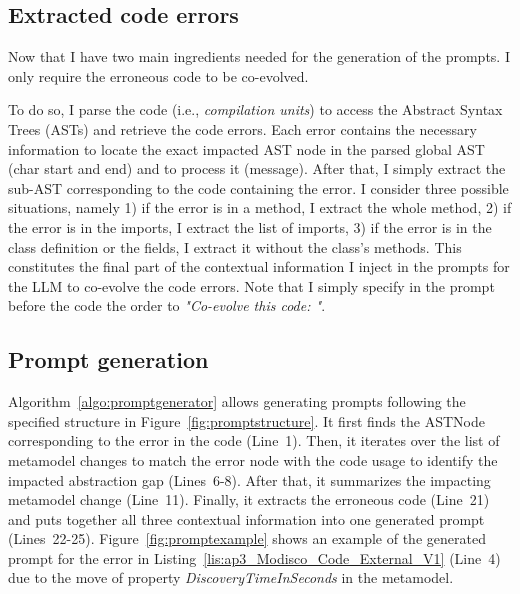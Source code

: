 \subsection{Extracted code errors}

Now that I have two main ingredients needed for the generation of the prompts. %
I only require the erroneous code to be co-evolved. 

To do so, I parse the code (i.e., \emph{compilation units}) to access the Abstract Syntax Trees (ASTs) and retrieve the code errors. %
Each error contains the necessary information to locate the exact impacted AST node in the parsed global AST (\ie char start and end) and to process it (\ie message). 
After that, I simply extract the sub-AST corresponding to the code containing the error. 
I consider three possible situations, namely 1) if the error is in a method, I extract the whole method, 2) if the error is in the imports, I extract the list of imports, 3) if the error is in the class definition or the fields, I extract it without the class's methods. This constitutes the final part of the contextual information I inject in the prompts for the LLM to co-evolve the code errors. Note that I simply specify in the prompt before the code the order to \emph{"Co-evolve this code: "}.




\subsection{Prompt generation}
\label{promptgeneration}

Algorithm~\ref{algo:promptgenerator} allows generating prompts following the specified structure in Figure~\ref{fig:promptstructure}. It first finds the ASTNode corresponding to the error in the code (Line~1). Then, it iterates over the list of metamodel changes to match  the error node with the code usage to identify the impacted abstraction gap (Lines~6-8). After that, it summarizes the impacting metamodel change (Line~11). Finally, it extracts the erroneous code (Line~21) and puts together all three contextual information into one generated prompt (Lines~22-25). 
%
Figure~\ref{fig:promptexample} shows an example of the generated prompt for the error in Listing~\ref{lis:ap3_Modisco_Code_External_V1} (Line~4) due to the move of property \emph{DiscoveryTimeInSeconds} in the metamodel.  

